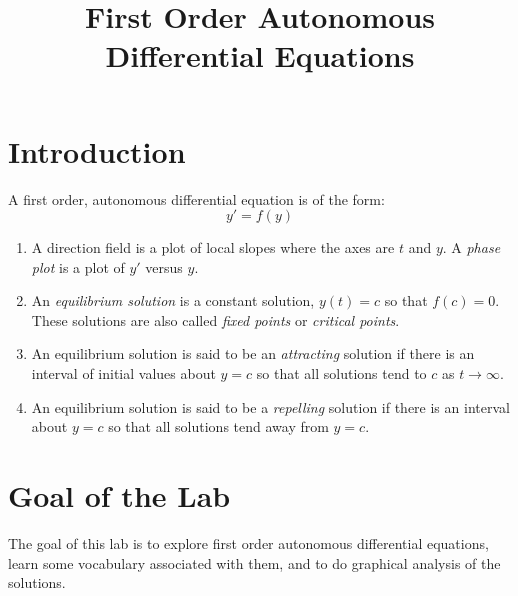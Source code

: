 \documentclass[12pt]{amsart}
\title{First Order Autonomous Differential Equations}
\begin{document}
\maketitle

\section{Introduction}
A first order, autonomous differential equation is of the form:
$$
y'=f(y)
$$
\begin{enumerate}
\item A direction field is a plot of local slopes where the axes
are $t$ and $y$.  A {\it phase plot} is a plot of $y'$ versus $y$.
\item An {\it equilibrium solution} is a constant solution,
$y(t)=c$ so that $f(c)=0$.  These solutions are also called {\it
fixed points} or {\it critical points}.
\item An equilibrium solution is said to be an {\it attracting}
solution if there is an interval of initial values about $y=c$ so
that all solutions tend to $c$ as $t\rightarrow \infty$.
\item An equilibrium solution is said to be a {\it repelling}
solution if there is an interval about $y=c$ so that all solutions
tend away from $y=c$.
\end{enumerate}

\section{Goal of the Lab}
The goal of this lab is to explore first order autonomous
differential equations, learn some vocabulary associated with
them, and to do graphical analysis of the solutions.
\end{document}
